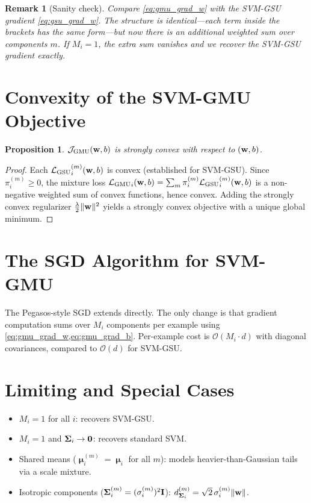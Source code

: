 \documentclass[11pt, letterpaper]{article}
\newcommand{\bSigma}{\vb{\Sigma}}
\newcommand{\bmu}{\boldsymbol{\upmu}}
\newcommand{\loss}{\mathcal{L}}
\newcommand{\obj}{\mathcal{J}}
\newtheorem{proposition}[theorem]{Proposition}
\newtheorem{remark}{Remark}[section]
\begin{document}
\begin{remark}[Sanity check]
Compare \cref{eq:gmu_grad_w} with the SVM-GSU gradient \cref{eq:gsu_grad_w}. The structure is identical---each term inside the brackets has the same form---but now there is an additional weighted sum over components $m$. If $M_i = 1$, the extra sum vanishes and we recover the SVM-GSU gradient exactly.
\end{remark}

\section{Convexity of the SVM-GMU Objective}\label{sec:gmu_convexity}

\begin{proposition}
$\obj_{\text{GMU}}(\vb{w}, b)$ is strongly convex with respect to $(\vb{w}, b)$.
\end{proposition}

\begin{proof}
Each ${\loss_{\text{GSU}}}_{i}^{(m)}(\vb{w}, b)$ is convex (established for SVM-GSU). Since $\pi_i^{(m)} \geq 0$, the mixture loss ${\loss_{\text{GMU}}}_{i}(\vb{w}, b) = \sum_m \pi_i^{(m)} {\loss_{\text{GSU}}}_{i}^{(m)}(\vb{w}, b)$ is a non-negative weighted sum of convex functions, hence convex. Adding the strongly convex regularizer $\frac{\lambda}{2}\|\vb{w}\|^2$ yields a strongly convex objective with a unique global minimum.
\end{proof}

\section{The SGD Algorithm for SVM-GMU}\label{sec:gmu_sgd}

The Pegasos-style SGD extends directly. The only change is that gradient computation sums over $M_i$ components per example using \cref{eq:gmu_grad_w,eq:gmu_grad_b}. Per-example cost is $\mathcal{O}(M_i \cdot d)$ with diagonal covariances, compared to $\mathcal{O}(d)$ for SVM-GSU.

\section{Limiting and Special Cases}\label{sec:gmu_special}

\begin{itemize}[leftmargin=2em]
    \item $M_i = 1$ for all $i$: recovers SVM-GSU.
    \item $M_i = 1$ and $\bSigma_i \to \vb{0}$: recovers standard SVM.
    \item Shared means ($\bmu_i^{(m)} = \bmu_i$ for all $m$): models heavier-than-Gaussian tails via a scale mixture.
    \item Isotropic components ($\bSigma_i^{(m)} = (\sigma_i^{(m)})^2 \vb{I}$): $d_{\bSigma_i}^{(m)} = \sqrt{2}\, \sigma_i^{(m)} \|\vb{w}\|$.
\end{itemize}
\end{document}

